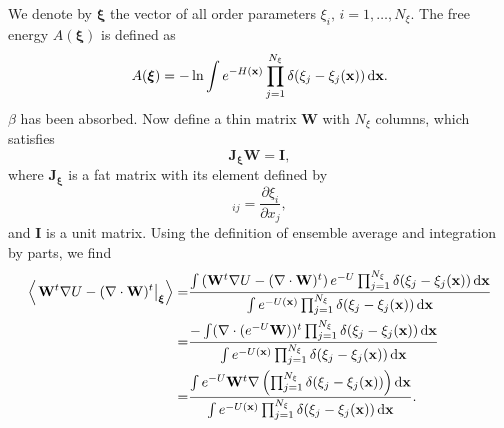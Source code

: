 We denote by $\boldsymbol{\xi}$ the vector of all order parameters $\xi_i,\,i=1,\dots,N_\xi$. The free energy $A(\boldsymbol{\xi})$ is defined as
\begin{equation}
    A(\boldsymbol{\xi})=-\ln\int e^{-H(\mathbf{x})}\prod_{j=1}^{N_\xi}\delta(\xi_j-\xi_j(\mathbf{x}))\mathop{}\!\mathrm{d} \mathbf{x}.
\end{equation}
$\beta$ has been absorbed. Now define a thin matrix $\mathbf{W}$ with $N_\xi$ columns, which satisfies
\begin{equation}
    \mathbf{J}_{\boldsymbol{\xi}} \mathbf{W}=\mathbf{I},
\end{equation} 
where $\mathbf{J}_{\boldsymbol{\xi}}$ is a fat matrix with its element defined by
\begin{equation}
    [\mathbf{J}_{\boldsymbol{\xi}}]_{ij}=\frac{\partial \xi_i}{\partial x_j},
\end{equation}
and $\mathbf{I}$ is a unit matrix. Using the definition of ensemble average and integration by parts, we find
\begin{align}
    \left<\left.\mathbf{W}^t\nabla U-(\nabla\cdot \mathbf{W})^t\right|_{\boldsymbol{\xi}}\right>=&\frac{\int\left(\mathbf{W}^t\nabla U-(\nabla\cdot \mathbf{W})^t\right)e^{-U}\prod_{j=1}^{N_\xi}\delta(\xi_j-\xi_j(\mathbf{x}))\mathop{}\!\mathrm{d} \mathbf{x}}{\int e^{-U(\mathbf{x})}\prod_{j=1}^{N_\xi}\delta(\xi_j-\xi_j(\mathbf{x}))\mathop{}\!\mathrm{d} \mathbf{x}}\notag\\
    =&\frac{-\int (\nabla\cdot(e^{-U}\mathbf{W}))^t\prod_{j=1}^{N_\xi}\delta(\xi_j-\xi_j(\mathbf{x}))\mathop{}\!\mathrm{d}\mathbf{x}}{\int e^{-U(\mathbf{x})}\prod_{j=1}^{N_\xi}\delta(\xi_j-\xi_j(\mathbf{x}))\mathop{}\!\mathrm{d} \mathbf{x}}\notag\\
    =&\frac{\int e^{-U}\mathbf{W}^t\nabla\left(\prod_{j=1}^{N_\xi}\delta(\xi_j-\xi_j(\mathbf{x}))\right)\mathop{}\!\mathrm{d} \mathbf{x}}{\int e^{-U(\mathbf{x})}\prod_{j=1}^{N_\xi}\delta(\xi_j-\xi_j(\mathbf{x}))\mathop{}\!\mathrm{d} \mathbf{x}}.
\end{align}

